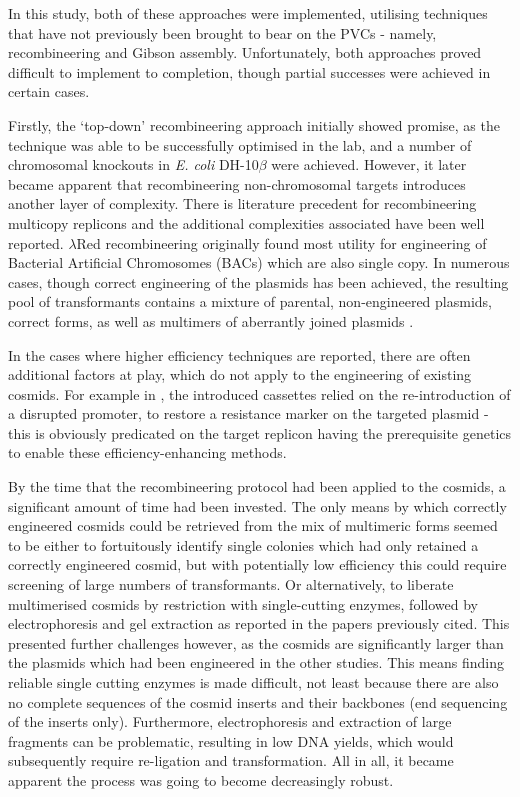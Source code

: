 In this study, both of these approaches were implemented, utilising techniques that have not previously been brought to bear on the PVCs - namely, recombineering and Gibson assembly. Unfortunately, both approaches proved difficult to implement to completion, though partial successes were achieved in certain cases.

Firstly, the `top-down' recombineering approach initially showed promise, as the technique was able to be successfully optimised in the lab, and a number of chromosomal knockouts in \emph{E. coli} DH-10$\beta$ were achieved. However, it later became apparent that recombineering non-chromosomal targets introduces another layer of complexity. There is literature precedent for recombineering multicopy replicons and the additional complexities associated have been well reported. $\lambda$Red recombineering originally found most utility for engineering of Bacterial Artificial Chromosomes (BACs) which are also single copy. In numerous cases, though correct engineering of the plasmids has been achieved, the resulting pool of transformants contains a mixture of parental, non-engineered plasmids, correct forms, as well as multimers of aberrantly joined plasmids \citep{Thomason2007, Lee2001a, Yosef2004, Vetcher2005}.

In the cases where higher efficiency techniques are reported, there are often additional factors at play, which do not apply to the engineering of existing cosmids. For example in \cite{Yosef2004}, the introduced cassettes relied on the re-introduction of a disrupted promoter, to restore a resistance marker on the targeted plasmid - this is obviously predicated on the target replicon having the prerequisite genetics to enable these efficiency-enhancing methods.

By the time that the recombineering protocol had been applied to the cosmids, a significant amount of time had been invested. The only means by which correctly engineered cosmids could be retrieved from the mix of multimeric forms seemed to be either to fortuitously identify single colonies which had only retained a correctly engineered cosmid, but with potentially low efficiency this could require screening of large numbers of transformants. Or alternatively, to liberate multimerised cosmids by restriction with single-cutting enzymes, followed by electrophoresis and gel extraction as reported in the papers previously cited. This presented further challenges however, as the cosmids are significantly larger than the plasmids which had been engineered in the other studies. This means finding reliable single cutting enzymes is made difficult, not least because there are also no complete sequences of the cosmid inserts and their backbones (end sequencing of the inserts only). Furthermore, electrophoresis and extraction of large fragments can be problematic, resulting in low DNA yields, which would subsequently require re-ligation and transformation. All in all, it became apparent the process was going to become decreasingly robust.

